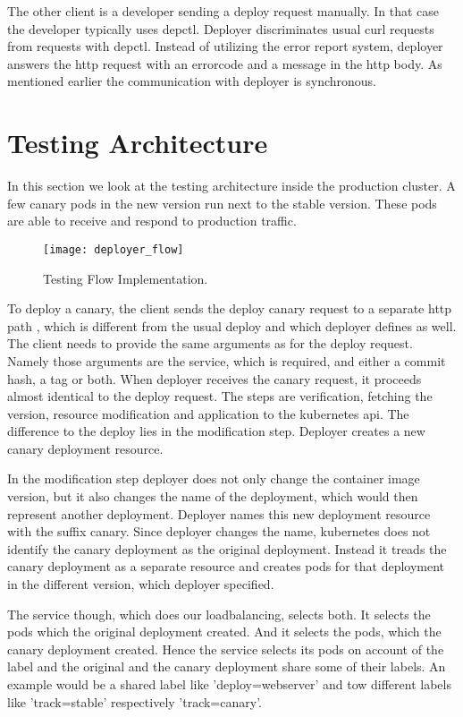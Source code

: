 The other client is a developer sending a deploy request manually. In that case the
developer typically uses depctl. Deployer discriminates usual curl requests from requests
with depctl. Instead of utilizing the error report system, deployer answers the http
request with an errorcode and a message in the http body. As mentioned earlier the
communication with deployer is synchronous.

\section{Testing Architecture}

In this section we look at the testing architecture inside the production cluster. A few
canary pods in the new version run next to the stable version. These pods are able to
receive and respond to production traffic.

\begin{figure}[htbp] \centering \texttt{[image: deployer\_flow]}
  \caption[nprtflow]{Testing Flow Implementation.}
  \label{fig:testing_flow}
\end{figure}


To deploy a canary, the client sends the deploy canary request to a separate http path ,
which is different from the usual deploy and which deployer defines as well. The client
needs to provide the same arguments as for the deploy request. Namely those arguments are
the service, which is required, and either a commit hash, a tag or both. When deployer
receives the canary request, it proceeds almost identical to the deploy request. The steps
are verification, fetching the version, resource modification and application to the
kubernetes api. The difference to the deploy lies in the modification step. Deployer
creates a new canary deployment resource.

In the modification step deployer does not only change the container image version, but it
also changes the name of the deployment, which would then represent another
deployment. Deployer names this new deployment resource with the suffix canary. Since
deployer changes the name, kubernetes does not identify the canary deployment as the
original deployment. Instead it treads the canary deployment as a separate resource and
creates pods for that deployment in the different version, which deployer specified.

The service though, which does our loadbalancing, selects both. It selects the pods which
the original deployment created. And it selects the pods, which the canary deployment
created. Hence the service selects its pods on account of the label and the original and
the canary deployment share some of their labels. An example would be a shared label like
'deploy=webserver' and tow different labels like 'track=stable' respectively
'track=canary'.

